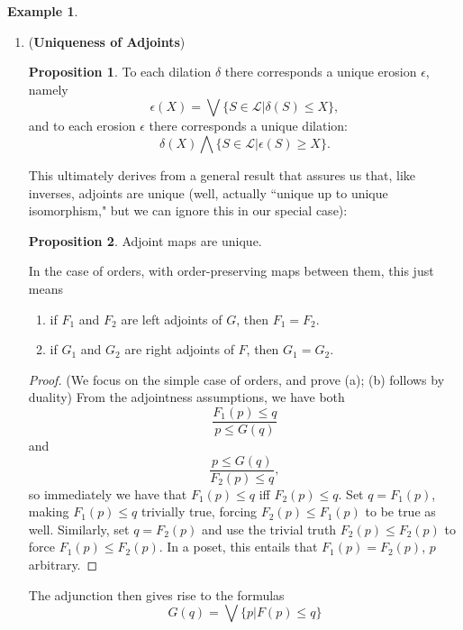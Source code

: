 \documentclass[a4paper]{book}
\theoremstyle{definition}
\newtheorem{example}{Example}[section]
\theoremstyle{definition}
\theoremstyle{definition}
\newtheorem{proposition}{Proposition}[section]
\theoremstyle{theorem}
\theoremstyle{definition}
\begin{document}
\begin{example}
\begin{enumerate}
	\item (\textbf{Uniqueness of Adjoints}) 
	\begin{proposition} To each dilation $\delta$ there corresponds a unique erosion $\epsilon$, namely 
	\begin{equation*}
	\epsilon(X) = \bigvee \{S \in \mathcal{L}| \delta(S) \leq X\},
	\end{equation*}
	and to each erosion $\epsilon$ there corresponds a unique dilation: 
	\begin{equation*}
	\delta(X) \bigwedge \{S \in \mathcal{L}| \epsilon(S) \geq X\}.
	\end{equation*}
	\end{proposition} 
	This ultimately derives from a general result that assures us that, like inverses, adjoints are unique (well, actually ``unique up to unique isomorphism," but we can ignore this in our special case): 
	\begin{proposition}
		Adjoint maps are unique.
	\end{proposition} 
In the case of orders, with order-preserving maps between them, this just means 
\begin{enumerate}
	\item if $F_1$ and $F_2$ are left adjoints of $G$, then $F_1 = F_2$. 
	\item if $G_1$ and $G_2$ are right adjoints of $F$, then $G_1 = G_2$.
\end{enumerate}
\begin{proof}
	(We focus on the simple case of orders, and prove (a); (b) follows by duality) From the adjointness assumptions, we have both  
	\begin{equation*}
	\frac{F_1(p) \leq q}{p \leq G(q)}
	\end{equation*}
	and 
	\begin{equation*}
	\frac{p \leq G(q)}{F_2(p) \leq q}, 
	\end{equation*}
	so immediately we have that $F_1(p) \leq q$ iff $F_2(p) \leq q$. Set $q = F_1(p)$, making $F_1(p) \leq q$ trivially true, forcing $F_2(p) \leq F_1(p)$ to be true as well. Similarly, set $q = F_2(p)$ and use the trivial truth $F_2(p) \leq F_2(p)$ to force $F_1(p) \leq F_2(p)$. In a poset, this entails that $F_1(p) = F_2(p)$, $p$ arbitrary. 
\end{proof}
The adjunction then gives rise to the formulas 
\begin{equation*}
G(q) = \bigvee \{p|F(p) \leq q\}
\end{equation*}

\end{enumerate}
\end{example}
\end{document}
